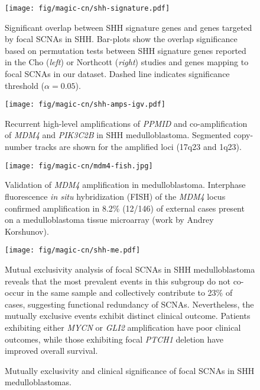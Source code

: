 \documentclass[11pt,letterpaper]{article}
\theoremstyle{definition}
\begin{document}
\clearpage

\begin{SCfigure}
	\centering
	\texttt{[image: fig/magic-cn/shh-signature.pdf]}
	\caption{Significant overlap between SHH signature genes and genes targeted by focal SCNAs in SHH.
		Bar-plots show the overlap significance based on permutation tests between SHH signature genes reported in the Cho (\emph{left}) or Northcott (\emph{right}) studies and genes mapping to focal SCNAs in our dataset. Dashed line indicates significance threshold ($\alpha = 0.05$).}
	\label{fig:shh-signature}
\end{SCfigure}

\begin{SCfigure}
	\centering
	\texttt{[image: fig/magic-cn/shh-amps-igv.pdf]}
	\caption{Recurrent high-level amplifications of \emph{PPMID} and co-amplification of \emph{MDM4} and \emph{PIK3C2B} in SHH medulloblastoma.
	Segmented copy-number tracks are shown for the amplified loci (17q23 and 1q23).}
	\label{fig:shh-amps-igv}
\end{SCfigure}

\begin{SCfigure}
	\centering
	\texttt{[image: fig/magic-cn/mdm4-fish.jpg]}
	\caption{Validation of \emph{MDM4} amplification in medulloblastoma.
	Interphase fluorescence \emph{in situ} hybridization (FISH) of the \emph{MDM4} locus confirmed amplification in 8.2\% (12/146) of external cases present on a medulloblastoma tissue microarray (work by Andrey Korshunov).}
	\label{fig:mdm4-fish}
\end{SCfigure}

\clearpage

\begin{figure}[h]
	\begin{center}
		\texttt{[image: fig/magic-cn/shh-me.pdf]}
	\end{center}
	\caption{Mutually exclusivity and clinical significance of focal SCNAs in SHH medulloblastomas.}
	Mutual exclusivity analysis of focal SCNAs in SHH medulloblastoma reveals that the most prevalent events in this subgroup do not co-occur in the same sample and collectively contribute to 23\% of cases, suggesting functional redundancy of SCNAs. Nevertheless, the mutually exclusive events exhibit distinct clinical outcome. Patients exhibiting either \emph{MYCN} or \emph{GLI2} amplification have poor clinical outcomes, while those exhibiting focal \emph{PTCH1} deletion have improved overall survival.
	\label{fig:shh-me}
\end{figure}
\end{document}
